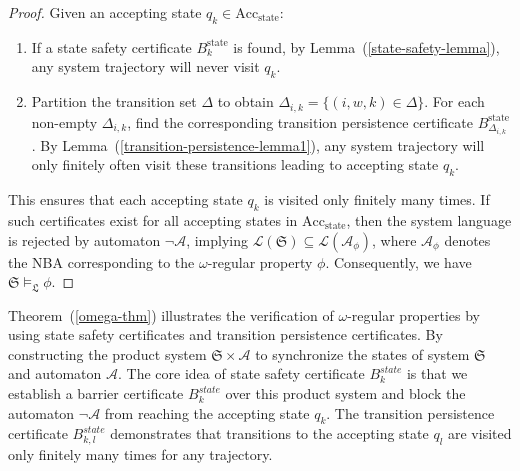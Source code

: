 \documentclass[acmlarge]{acmart}
\begin{document}
\begin{proof}
  Given an accepting state $q_k \in \text{Acc}_{\text{state}}$:
  \begin{enumerate}
      \item If a state safety certificate $B_k^{\text{state}}$ is found, by Lemma~(\ref{state-safety-lemma}), any system trajectory will never visit $q_k$.
      
      \item Partition the transition set $\Delta$ to obtain $\Delta_{i,k} = \{(i, w, k) \in \Delta\}$. For each non-empty $\Delta_{i,k}$, find the corresponding transition persistence certificate $B_{\Delta_{i,k}}^{\text{state}}$. By Lemma~(\ref{transition-persistence-lemma1}), any system trajectory will only finitely often visit these transitions leading to accepting state $q_k$.
  \end{enumerate}
   
  This ensures that each accepting state $q_k$ is visited only finitely many times. If such certificates exist for all accepting states in $\text{Acc}_{\text{state}}$, then the system language is rejected by automaton $\mathcal{\lnot A}$, implying $\mathcal{L}(\mathfrak{S}) \subseteq \mathcal{L}(\mathcal{A}_\phi)$, where $\mathcal{A}_\phi$ denotes the NBA corresponding to the $\omega$-regular property $\phi$. Consequently, we have $\mathfrak{S} \models_{\mathfrak{L}} \phi$.
\end{proof}

Theorem~(\ref{omega-thm}) illustrates the verification of $\omega$-regular properties by using state safety certificates and transition persistence certificates. By constructing the product system $\mathfrak{S} \times \mathcal{A}$ to synchronize the states of system $\mathfrak{S}$ and automaton $\mathcal{A}$. The core idea of state safety certificate $B_k^{state}$ is that we establish a barrier certificate $B_k^{state}$ over this product system and block the automaton $\lnot \mathcal{A}$ from reaching the accepting state $q_k$. The transition persistence certificate $B_{k, l}^{state}$ demonstrates that transitions to the accepting state $q_l$ are visited only finitely many times for any trajectory.
 
\end{document}
